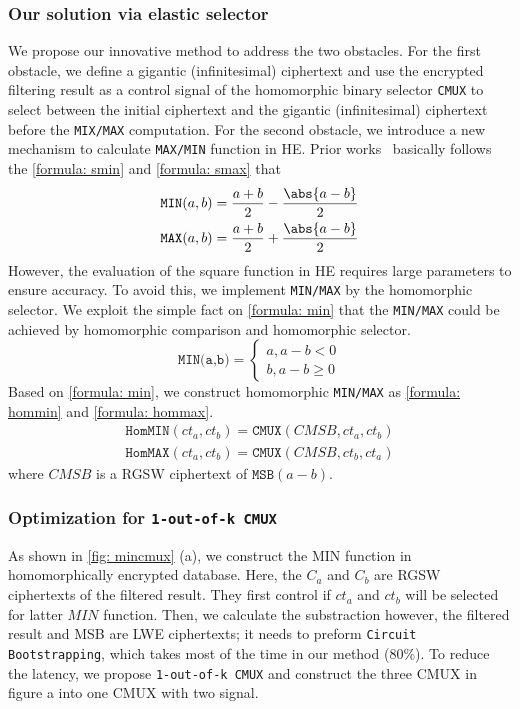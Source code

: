 \subsubsection{Our solution via elastic selector}
We propose our innovative method to address the two obstacles.
For the first obstacle, we define a gigantic (infinitesimal) ciphertext
and use the encrypted filtering result 
as a control signal of the homomorphic binary selector \texttt{CMUX}
to select between the initial ciphertext and 
the gigantic (infinitesimal) ciphertext
before the \texttt{MIX/MAX} computation.
For the second obstacle, we introduce a new mechanism
to calculate \texttt{MAX/MIN} function in HE.
Prior works~\cite{ckkscomparison, pegasus} basically follows 
the \cref{formula: smin} and \cref{formula: smax} that
\begin{gather}
    \texttt{MIN}(a, b) = \frac{a+b}{2} - \frac{\abs{a-b}}{2} 
    \label{formula: smin}
    \\
    \texttt{MAX}(a, b) = \frac{a+b}{2} + \frac{\abs{a-b}}{2}
    \label{formula: smax}
\end{gather} 
However, the evaluation of the square function 
in HE requires large parameters 
to ensure accuracy. 
To avoid this, we implement \texttt{MIN/MAX} by the homomorphic selector.
We exploit the simple fact on \cref{formula: min} that the 
\texttt{MIN/MAX} could be achieved by homomorphic comparison and 
homomorphic selector.
\begin{equation}
    \texttt{MIN(a,b)} = \begin{cases}
    a, a - b < 0 \\
    b, a - b \geq 0
    \end{cases}
    \label{formula: min}
\end{equation}
Based on \cref{formula: min}, we construct homomorphic \texttt{MIN/MAX}
as \cref{formula: hommin} and \cref{formula: hommax}.
\begin{gather}
    \texttt{HomMIN}(ct_a, ct_b) = \texttt{CMUX}(CMSB, ct_a, ct_b) 
    \label{formula: hommin}
    \\
    \texttt{HomMAX}(ct_a, ct_b) = \texttt{CMUX}(CMSB, ct_b, ct_a)
    \label{formula: hommax}
\end{gather} 
where $CMSB$ is a RGSW ciphertext of $\texttt{MSB}(a-b)$.

\subsubsection{Optimization for \texttt{1-out-of-k CMUX}}
As shown in \cref{fig: mincmux} (a), we construct the MIN function
in homomorphically encrypted database.
Here, the $C_a$ and $C_b$ are 
RGSW ciphertexts of the filtered result.
They first control if $ct_a$ and $ct_b$ will be selected 
for latter $MIN$ function. 
Then, we calculate the substraction 
however, the filtered result and MSB are LWE ciphertexts;
it needs to preform \texttt{Circuit Bootstrapping}, 
which takes most of the time in our method (80\%).
To reduce the latency, we propose \texttt{1-out-of-k CMUX}
and construct the three CMUX in figure a into one CMUX
with two signal.



